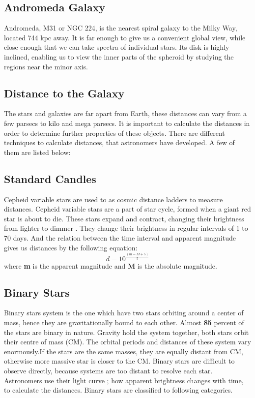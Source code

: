 \subsection{Andromeda Galaxy}
  Andromeda, M31 or NGC 224, is the nearest spiral galaxy to the Milky Way, located 744 kpc away. It is far enough to give us a convenient global view, while close enough that we can take spectra of individual stars. Its disk is highly inclined, enabling us to view the inner parts of the spheroid by studying the regions near the minor axis. 

\subsection{Distance to the Galaxy}

The stars and galaxies are far apart from Earth, these distances can vary from a few parsecs to kilo and mega parsecs. It is important to calculate the distances in order to determine further properties of these objects. There are different techniques to calculate distances, that astronomers have developed.
A few of them are listed below:

\subsection{Standard Candles}
 Cepheid variable stars are used to as cosmic distance ladders to measure distances. Cepheid variable stars are a part of star cycle, formed when a giant red star is about to die. These stars expand and contract, changing their brightness from lighter to dimmer \cite{stanc}.  They change their brightness in regular intervals of 1 to 70 days. And the relation between the time interval and apparent magnitude gives us distances by the following equation:
 \begin{equation}
 d= 10^{\frac{(m-M+5)}{5}}
 \end{equation}
where \textbf{m} is the apparent magnitude and \textbf{M} is the absolute magnitude.

\subsection*{Binary Stars }

\cite{bin}Binary stars system is the one which have two stars orbiting around a center of mass, hence they are gravitationally bound to each other. Almost \textbf{85} percent of the stars are binary in nature. Gravity hold the system together, both stars orbit their centre of mass (CM). The orbital periods and distances of these system vary enormously.If the stars are the same masses, they are equally distant from CM, otherwise more massive star is closer to the CM. Binary stars are difficult to observe directly, because systems are too distant to resolve each star.  Astronomers use their light curve ; how apparent brightness changes with time, to calculate the distances. Binary stars are classified to following categories.

